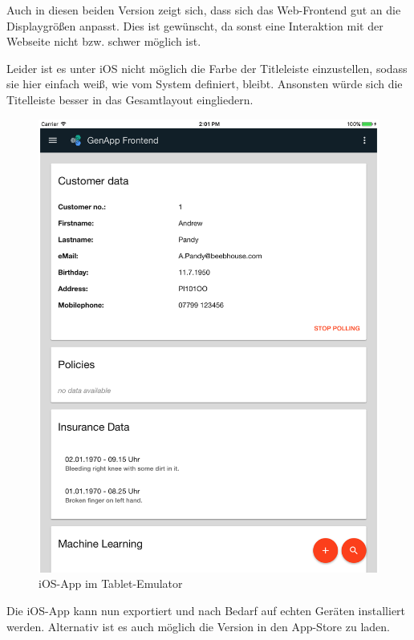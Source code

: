 Auch in diesen beiden Version zeigt sich, dass sich das Web-Frontend gut an die Displaygrößen anpasst. Dies ist gewünscht,
da sonst eine Interaktion mit der Webseite nicht bzw. schwer möglich ist.

Leider ist es unter iOS nicht möglich die Farbe der Titleleiste einzustellen, sodass sie hier einfach weiß, wie vom System
definiert, bleibt. Ansonsten würde sich die Titelleiste besser in das Gesamtlayout eingliedern.

\begin{figure}[h]
 \centering
   \includegraphics[scale=0.2]{images/kapitel_4/frontend_tablet_ios.png}
 \caption{iOS-App im Tablet-Emulator}
 \label{fig:frontend_tablet_ios}
\end{figure}

Die iOS-App kann nun exportiert und nach Bedarf auf echten Geräten installiert werden. Alternativ ist es auch möglich
die Version in den App-Store zu laden.
